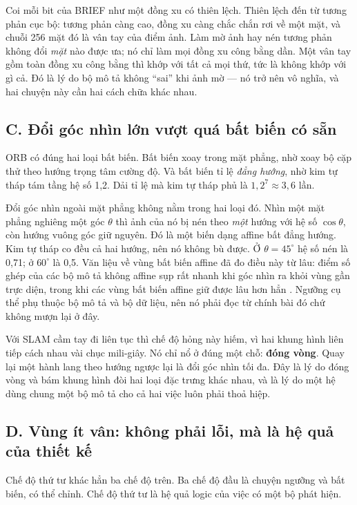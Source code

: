 \documentclass[../../deep_learning.tex]{subfiles}
\begin{document}
\begin{trucgiac}
Coi mỗi bit của BRIEF như một đồng xu có thiên lệch. Thiên lệch đến từ tương phản cục bộ: tương phản càng cao, đồng xu càng chắc chắn rơi về một mặt, và chuỗi 256 mặt đó là vân tay của điểm ảnh. Làm mờ ảnh hay nén tương phản không đổi \emph{mặt} nào được ưa; nó chỉ làm mọi đồng xu công bằng dần. Một vân tay gồm toàn đồng xu công bằng thì khớp với tất cả mọi thứ, tức là không khớp với gì cả. Đó là lý do bộ mô tả không ``sai'' khi ảnh mờ --- nó trở nên vô nghĩa, và hai chuyện này cần hai cách chữa khác nhau.
\end{trucgiac}

\subsection{C. Đổi góc nhìn lớn vượt quá bất biến có sẵn}
ORB có đúng hai loại bất biến. Bất biến xoay trong mặt phẳng, nhờ xoay bộ cặp thử theo hướng trọng tâm cường độ. Và bất biến tỉ lệ \emph{đẳng hướng}, nhờ kim tự tháp tám tầng hệ số 1{,}2. Dải tỉ lệ mà kim tự tháp phủ là \(1{,}2^{7} \approx 3{,}6\) lần.

Đổi góc nhìn ngoài mặt phẳng không nằm trong hai loại đó. Nhìn một mặt phẳng nghiêng một góc \(\theta\) thì ảnh của nó bị nén theo \emph{một} hướng với hệ số \(\cos\theta\), còn hướng vuông góc giữ nguyên. Đó là một biến dạng affine bất đẳng hướng. Kim tự tháp co đều cả hai hướng, nên nó không bù được. Ở \(\theta = 45^{\circ}\) hệ số nén là 0{,}71; ở \(60^{\circ}\) là 0{,}5. Văn liệu về vùng bất biến affine đã đo điều này từ lâu: điểm số ghép của các bộ mô tả không affine sụp rất nhanh khi góc nhìn ra khỏi vùng gần trực diện, trong khi các vùng bất biến affine giữ được lâu hơn hẳn \cite{mikolajczyk2005affine}. Ngưỡng cụ thể phụ thuộc bộ mô tả và bộ dữ liệu, nên nó phải đọc từ chính bài đó chứ không mượn lại ở đây.

Với SLAM cầm tay đi liên tục thì chế độ hỏng này hiếm, vì hai khung hình liên tiếp cách nhau vài chục mili-giây. Nó chỉ nổ ở đúng một chỗ: \textbf{đóng vòng}. Quay lại một hành lang theo hướng ngược lại là đổi góc nhìn tối đa. Đây là lý do đóng vòng và bám khung hình đòi hai loại đặc trưng khác nhau, và là lý do một hệ dùng chung một bộ mô tả cho cả hai việc luôn phải thoả hiệp.


\subsection{D. Vùng ít vân: không phải lỗi, mà là hệ quả của thiết kế}
Chế độ thứ tư khác hẳn ba chế độ trên. Ba chế độ đầu là chuyện ngưỡng và bất biến, có thể chỉnh. Chế độ thứ tư là hệ quả logic của việc có một bộ phát hiện.
\end{document}
